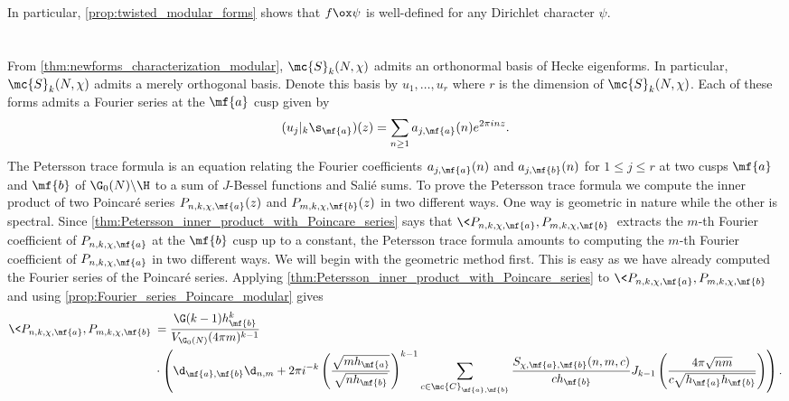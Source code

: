 \documentclass[12pt]{article}
\begin{document}
      In particular, \cref{prop:twisted_modular_forms} shows that \(f \ox \psi\) is well-defined for any Dirichlet character \(\psi\).
    \section{}
      From \cref{thm:newforms_characterization_modular}, \(\mc{S}_{k}(N,\chi)\) admits an orthonormal basis of Hecke eigenforms. In particular, \(\mc{S}_{k}(N,\chi)\) admits a merely orthogonal basis. Denote this basis by \(u_{1},\ldots,u_{r}\) where \(r\) is the dimension of \(\mc{S}_{k}(N,\chi)\). Each of these forms admits a Fourier series at the \(\mf{a}\) cusp given by
      \[
        (u_{j}|_{k}\s_{\mf{a}})(z) = \sum_{n \ge 1}a_{j,\mf{a}}(n)e^{2\pi inz}.
      \]
      The Petersson trace formula is an equation relating the Fourier coefficients \(a_{j,\mf{a}}(n)\) and \(a_{j,\mf{b}}(n)\) for \(1 \le j \le r\) at two cusps \(\mf{a}\) and \(\mf{b}\) of \(\G_{0}(N)\backslash\H\) to a sum of \(J\)-Bessel functions and Sali\'e sums. To prove the Petersson trace formula we compute the inner product of two Poincar\'e series \(P_{n,k,\chi,\mf{a}}(z)\) and \(P_{m,k,\chi,\mf{b}}(z)\) in two different ways. One way is geometric in nature while the other is spectral. Since \cref{thm:Petersson_inner_product_with_Poincare_series} says that \(\<P_{n,k,\chi,\mf{a}},P_{m,k,\chi,\mf{b}}\>\) extracts the \(m\)-th Fourier coefficient of \(P_{n,k,\chi,\mf{a}}\) at the \(\mf{b}\) cusp up to a constant, the Petersson trace formula amounts to computing the \(m\)-th Fourier coefficient of \(P_{n,k,\chi,\mf{a}}\) in two different ways. We will begin with the geometric method first. This is easy as we have already computed the Fourier series of the Poincar\'e series. Applying \cref{thm:Petersson_inner_product_with_Poincare_series} to \(\<P_{n,k,\chi,\mf{a}},P_{m,k,\chi,\mf{b}}\>\) and using \cref{prop:Fourier_series_Poincare_modular} gives
      \begin{equation}\label{equ:Petersson_trace_1}
        \begin{aligned}
          \<P_{n,k,\chi,\mf{a}},P_{m,k,\chi,\mf{b}}\> &= \frac{\G(k-1)h_{\mf{b}}^{k}}{V_{\G_{0}(N)}(4\pi m)^{k-1}} \\
          &\cdot \left(\d_{\mf{a},\mf{b}}\d_{n,m}+2\pi i^{-k}\left(\frac{\sqrt{mh_{\mf{a}}}}{\sqrt{nh_{\mf{b}}}}\right)^{k-1}\sum_{c \in \mc{C}_{\mf{a},\mf{b}}}\frac{S_{\chi,\mf{a},\mf{b}}(n,m,c)}{ch_{\mf{b}}}J_{k-1}\left(\frac{4\pi\sqrt{nm}}{c\sqrt{h_{\mf{a}}h_{\mf{b}}}}\right)\right).
        \end{aligned}
      \end{equation}
\end{document}
